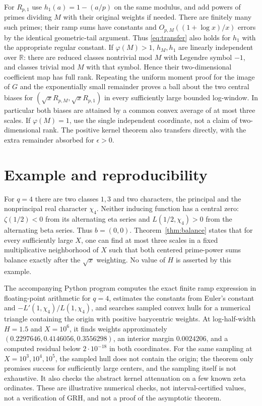 \documentclass[11pt]{article}
\theoremstyle{remark}\newtheorem{remark}[theorem]{Remark}
\newcommand{\R}{\mathbb R}\newcommand{\C}{\mathbb C}\newcommand{\Z}{\mathbb Z}
\begin{document}
For $R_{p,1}$ use $h_1(a)=1-(a/p)$ on the same modulus, and add powers of primes dividing $M$ with their original weights if needed. There are finitely many such primes; their ramp sums have constants and $O_{p,M}((1+\log x)/x)$ errors by the identical geometric-tail argument. Thus \eqref{eq:transfer} also holds for $h_1$ with the appropriate regular constant. If $\varphi(M)>1$, $h_M,h_1$ are linearly independent over $\R$: there are reduced classes nontrivial mod $M$ with Legendre symbol $-1$, and classes trivial mod $M$ with that symbol. Hence their two-dimensional coefficient map has full rank. Repeating the uniform moment proof for the image of $G$ and the exponentially small remainder proves a ball about the two central biases for $(\sqrt{x}R_{p,M},\sqrt{x}R_{p,1})$ in every sufficiently large bounded log-window. In particular both biases are attained by a common convex average of at most three scales. If $\varphi(M)=1$, use the single independent coordinate, not a claim of two-dimensional rank. The positive kernel theorem also transfers directly, with the extra remainder absorbed for $\epsilon>0$.

\section{Example and reproducibility}
For $q=4$ there are two classes $1,3$ and two characters, the principal and the nonprincipal real character $\chi_4$. Neither inducing function has a central zero: $\zeta(1/2)<0$ from its alternating eta series and $L(1/2,\chi_4)>0$ from the alternating beta series. Thus $b=(0,0)$. Theorem~\ref{thm:balance} states that for every sufficiently large $X$, one can find at most three scales in a fixed multiplicative neighborhood of $X$ such that both centered prime-power sums balance exactly after the $\sqrt{x}$ weighting. No value of $H$ is asserted by this example.

The accompanying Python program computes the exact finite ramp expression in floating-point arithmetic for $q=4$, estimates the constants from Euler's constant and $-L'(1,\chi_4)/L(1,\chi_4)$, and searches sampled convex hulls for a numerical triangle containing the origin with positive barycentric weights. At log-half-width $H=1.5$ and $X=10^6$, it finds weights approximately $(0.2297646,0.4146056,0.3556298)$, an interior margin $0.0024206$, and a computed residual below $2\cdot10^{-18}$ in both coordinates. For the same sampling at $X=10^3,10^4,10^5$, the sampled hull does not contain the origin; the theorem only promises success for sufficiently large centers, and the sampling itself is not exhaustive. It also checks the abstract kernel attenuation on a few known zeta ordinates. These are illustrative numerical checks, not interval-certified values, not a verification of GRH, and not a proof of the asymptotic theorem.
\end{document}
